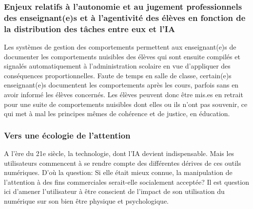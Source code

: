 \subsubsection{Enjeux relatifs à l’autonomie et au jugement professionnels des enseignant(e)s et à l'agentivité des élèves en fonction de la distribution des tâches entre eux et l’IA}

Les systèmes de gestion des comportements permettent aux enseignant(e)s de documenter les comportements nuisibles des élèves qui sont ensuite compilés et signalés automatiquement à l’administration scolaire en vue d’appliquer des conséquences proportionnelles. Faute de temps en salle de classe, certain(e)s enseignant(e)s documentent les comportements après les cours, parfois sans en avoir informé les élèves concernés. Les élèves peuvent donc être mis.es en retrait pour une suite de comportements nuisibles dont elles ou ils n’ont pas souvenir, ce qui met à mal les principes mêmes de cohérence et de justice, en éducation.

\subsubsection{Vers une écologie de l’attention }
A l’ère du 21e siècle, la technologie, dont l’IA devient indispensable. Mais les utilisateurs commencent à se rendre compte des différentes dérives de ces outils numériques. D’où la question: Si elle était mieux connue, la manipulation de l’attention à des fins commerciales serait-elle socialement acceptée? Il est question ici d’amener l’utilisateur à être conscient de l’impact de son utilisation du numérique sur son bien être physique et psychologique. 

